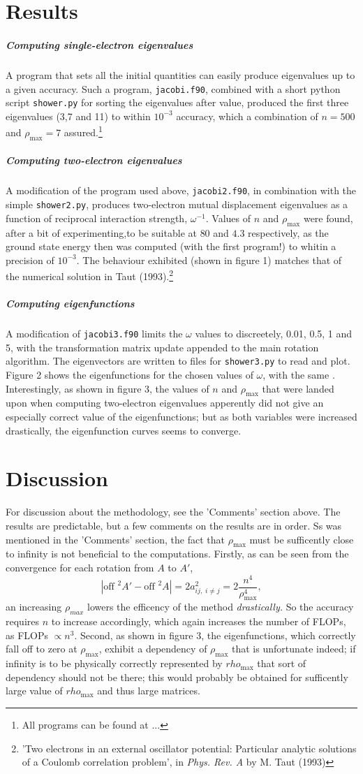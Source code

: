 \documentclass[a4paper,twocolumn,nofootinbib]{revtex4-1}
\begin{document}
\section*{Results}
\subparagraph{Computing single-electron eigenvalues} A program that sets all the initial quantities can easily produce eigenvalues up to a given accuracy. Such a program,
\texttt{jacobi.f90}, combined with a short python script \texttt{shower.py} for sorting the eigenvalues after value, produced the first three eigenvalues (3,7 and 11) to within $10^{-3}$ accuracy, which a combination
of $n=500$ and $\rho_\text{max}=7$ assured.\footnote{All programs can be found at ...}
\subparagraph{Computing two-electron eigenvalues} A modification of the program used above, \texttt{jacobi2.f90},
in combination with the simple \texttt{shower2.py}, produces two-electron mutual displacement eigenvalues as a function of reciprocal
interaction strength, $\omega^{-1}$. Values of $n$ and $\rho_\text{max}$ were found, after a bit of experimenting,to be suitable
at $80$ and $4.3$ respectively, as the ground state energy then was computed (with the first program!) to whitin a precision of $10^{-3}$.
The behaviour exhibited (shown in figure 1) matches that of the numerical solution
in Taut (1993).\footnote{'Two electrons in an external oscillator potential: Particular analytic solutions of a Coulomb correlation problem', in \textit{Phys. Rev. A} by M. Taut (1993)}
\subparagraph*{Computing eigenfunctions}
A modification of \texttt{jacobi3.f90} limits the $\omega$ values to discreetely, 0.01, 0.5, 1 and 5, with the transformation matrix update appended to the main rotation algorithm. The eigenvectors are written to files for \texttt{shower3.py} to read and plot.
Figure 2 shows the eigenfunctions for the chosen values of $\omega$, with the same . Interestingly, as shown in figure 3, the values of
$n$ and $\rho_\text{max}$ that were landed upon when computing two-electron eigenvalues apperently did not give an especially correct
value of the eigenfunctions; but as both variables were increased drastically, the eigenfunction curves seems to converge.
\section*{Discussion} For discussion about the methodology, see the 'Comments' section above. The results are predictable,
but a few comments on the results are in order. Ss was mentioned in the 'Comments' section, the fact that
$\rho_\text{max}$ must be sufficently close to infinity is not beneficial to the computations. Firstly, as can be seen from
the convergence for each rotation from $A$ to $A'$,
\[ |\text{off }^2A'-\text{off }^2A|=2a_{ij,\;i\neq j}^2 = 2\frac{n^4}{\rho_\text{max}^4},\]
an increasing $\rho_{max}$ lowers the efficency of the method \textit{drastically.} So the accuracy requires $n$ to
increase accordingly, which again increases the number of FLOPs, as FLOPs $\propto n^3$. Second, as shown in figure 3,
the eigenfunctions, which correctly fall off to zero at $\rho_\text{max}$, exhibit a dependency of $\rho_\text{max}$
that is unfortunate indeed; if infinity is to be physically correctly represented by $rho_\text{max}$ that sort of
dependency should not be there; this would probably be obtained for sufficently large value of $rho_\text{max}$ and thus large matrices.
\end{document}
